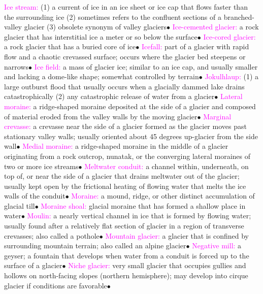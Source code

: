 \documentclass{article}
\newcommand{\ddd}{$\bullet$}
\newcommand{\pink}[1]{\textcolor{magenta}{#1}}
\newcommand{\vocab}[1]{{\pink{#1}}}
\begin{document}
\begin{multicols*}{4}
		\vocab{        Ice stream: } (1) a current of ice in an ice sheet or ice cap that flows faster than the surrounding ice (2) sometimes refers to the confluent sections of a branched-valley glacier (3) obsolete synonym of valley glaciers\ddd
		\vocab{        Ice-cemented glacier: } a rock glacier that has interstitial ice a meter or so below the surface\ddd
		\vocab{        Ice-cored glacier: } a rock glacier that has a buried core of ice\ddd
		\vocab{        Icefall: } part of a glacier with rapid flow and a chaotic crevassed surface; occurs where the glacier bed steepens or narrows\ddd
		\vocab{        Ice field: } a mass of glacier ice; similar to an ice cap, and usually smaller and lacking a dome-like shape; somewhat controlled by terrain\ddd
		\vocab{        Jokulhlaup: } (1) a large outburst flood that usually occurs when a glacially dammed lake drains catastrophically (2) any catastrophic release of water from a glacier\ddd
		\vocab{        Lateral moraine: } a ridge-shaped moraine deposited at the side of a glacier and composed of material eroded from the valley walls by the moving glacier\ddd
		\vocab{        Marginal crevasse: } a crevasse near the side of a glacier formed as the glacier moves past stationary valley walls; usually oriented about 45 degrees up-glacier from the side wall\ddd
		\vocab{        Medial moraine: } a ridge-shaped moraine in the middle of a glacier originating from a rock outcrop, nunatak, or the converging lateral moraines of two or more ice streams\ddd
		\vocab{        Meltwater conduit: } a channel within, underneath, on top of, or near the side of a glacier that drains meltwater out of the glacier; usually kept open by the frictional heating of flowing water that melts the ice walls of the conduit\ddd
		\vocab{        Moraine: } a mound, ridge, or other distinct accumulation of glacial till\ddd
		\vocab{        Moraine shoal: } glacial moraine that has formed a shallow place in water\ddd
		\vocab{        Moulin: } a nearly vertical channel in ice that is formed by flowing water; usually found after a relatively flat section of glacier in a region of transverse crevasses; also called a pothole\ddd
		\vocab{        Mountain glacier: } a glacier that is confined by surrounding mountain terrain; also called an alpine glacier\ddd
		\vocab{        Negative mill: } a geyser; a fountain that develops when water from a conduit is forced up to the surface of a glacier\ddd
		\vocab{        Niche glacier: } very small glacier that occupies gullies and hollows on north-facing slopes (northern hemisphere); may develop into cirque glacier if conditions are favorable\ddd

\end{multicols*}
\end{document}

